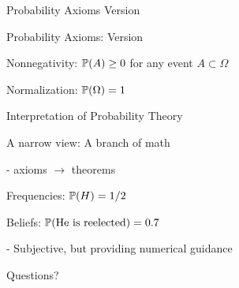\documentclass[fleqn,aspectratio=169]{beamer}
\begin{document}
\begin{frame}{Probability Axioms Version  }

\begin{block}{Probability Axioms: Version  }
\plitemsep 0.1in
\bce[{A}1.] 
\item Nonnegativity: $\mathbb{P}( A ) \geq 0$ for any event $A \subset \Omega$
\item Normalization: $\mathbb{P}( \Omega ) = 1$


\ece
\end{block}


\end{frame}

\begin{frame}{Interpretation of Probability Theory}


\plitemsep 0.5in
\bci
\item<1-> A narrow view: A branch of math

- axioms $\rightarrow$ theorems


\item<2-> Frequencies: $\mathbb{P}( H ) = 1/2$

\item<3-> Beliefs: $\mathbb{P}( \text{He is reelected} ) = 0.7$

- Subjective, but providing numerical guidance
\eci

\end{frame}


\begin{frame}{}
\vspace{2cm}
\LARGE Questions?




\end{frame}
\end{document}
